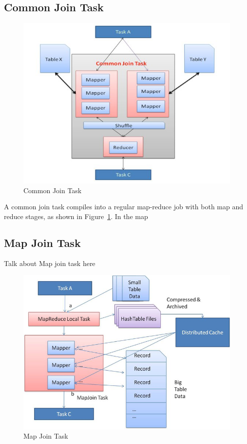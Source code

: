 \documentclass[11pt]{article}
\begin{document}
\subsection{Common Join Task}
\begin{figure}
	      \centering
                \includegraphics[scale=0.75]{common.jpg}
              \caption{Common Join Task \cite{facebook-join}}
              \label{fig:common-join}
\end{figure}

A common join task compiles into a regular map-reduce job with both map and reduce stages, as shown in Figure~\ref{fig:common-join}. In the map 

\subsection{Map Join Task}
Talk about Map join task here

\begin{figure}
	      \centering
                \includegraphics[scale=1]{mapjoin.jpg}
              \caption{Map Join Task \cite{facebook-join}}
              \label{fig:map-join}
\end{figure}
\end{document}
